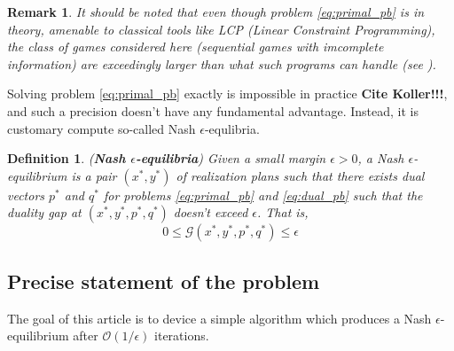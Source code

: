 \documentclass[12pt]{article}
\newtheorem{remark}{Remark}
\newtheorem{definition}[theorem]{Definition}
\begin{document}

\begin{remark}  
It should be noted that even though problem \eqref{eq:primal_pb} is in theory, amenable to classical tools like LCP (\textit{Linear Constraint Programming}), the class of games considered here (sequential games with imcomplete information) are exceedingly larger than what such programs can handle (see \cite{hoda2010smoothing}).
\end{remark}

Solving problem \eqref{eq:primal_pb} exactly is impossible in practice \textbf{Cite Koller!!!}, and such a precision doesn't have any fundamental advantage. Instead, it is customary compute so-called Nash $\epsilon$-equlibria.

\begin{definition}(\textbf{Nash $\epsilon$-equilibria})
Given a small margin $\epsilon > 0$, a Nash $\epsilon$-equilibrium is a pair $(x^*, y^*)$ of realization plans such that there exists dual vectors $p^*$ and $q^*$ for problems \eqref{eq:primal_pb} and \eqref{eq:dual_pb} such that the duality gap at $(x^*, y^*, p^*, q^*)$ doesn't exceed $\epsilon$. That is,
\begin{equation}
  0 \le \mathcal{G}(x^*, y^*, p^*, q^*) \le \epsilon
\label{eq:approx_pb}
\end{equation}
\end{definition}

\subsection{Precise statement of the problem}
The goal of this article is to device a simple algorithm which produces a Nash $\epsilon$-equilibrium after $\mathcal{O}(1/\epsilon)$ iterations.
\end{document}
